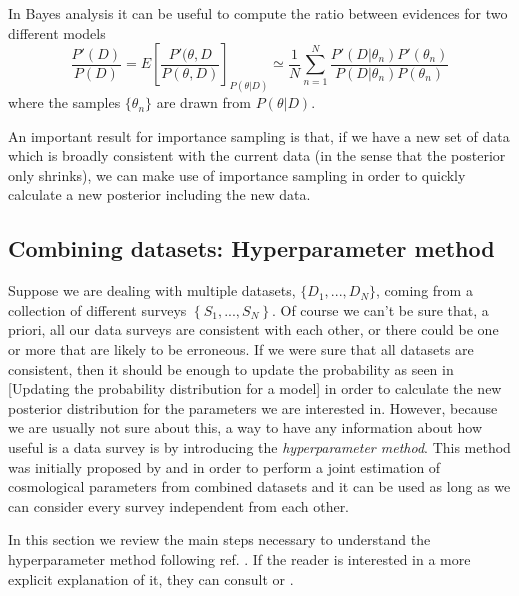 \documentclass[onecolumn,           %
               showpacs,            %
               preprintnumbers,     %
               aps,                 %
               letterpaper,             %
               superscriptaddress,      %
               nofootinbib,         %
               tightenlines,        %
               floats,floatfix      %
               ,usenatbib,
               ]{revtex4-1}
\begin{document}
In Bayes analysis it can be useful to compute the ratio between evidences for two different models
\begin{equation}\label{importanceratio}
\frac{P'(D)}{P(D)}=E\left[\frac{P'(\theta,D}{P(\theta,D)}\right]_{P(\theta|D)}\simeq \frac{1}{N}\sum_{n=1}^N\frac{P'(D|\theta_n)P'(\theta_n)}{P(D|\theta_n)P(\theta_n)}
\end{equation}
where the samples $\lbrace\theta_n\rbrace$ are drawn from $P(\theta|D)$.

An important result for importance sampling is that, if we have a new set of data which is broadly consistent with the current data (in the sense that the posterior only shrinks), we can make use of importance sampling in order to quickly calculate a new posterior including the new data.
\subsection{Combining datasets: Hyperparameter method}

Suppose we are dealing with multiple datasets,  $\lbrace D_1,...,D_N\rbrace$, coming from a collection of different surveys $\left\lbrace S_1,...,S_N\right\rbrace$. Of course we can't be sure that, a priori, all our data surveys are consistent with each other, or there could be one or more that are likely to be erroneous. If we were sure that all datasets are consistent, then it should be enough to update the probability as seen in [Updating the probability distribution for a model] in order to calculate the new posterior distribution for the parameters we are interested in. However, because we are usually not sure about this, a way to have any information about how useful is a data survey is by introducing the \textit{hyperparameter method}. This method was initially proposed by \cite{hiperp} and \cite{hiperp1} in order to perform a joint estimation of cosmological parameters from combined datasets and it can be used as long as we can consider every survey independent from each other.

In this section we review the main steps necessary to understand the hyperparameter method following ref. \cite{hiperp1}. If the reader is interested in a more explicit explanation of it, they can consult \cite{hiperp} or \cite{hiperp1}.
\end{document}
